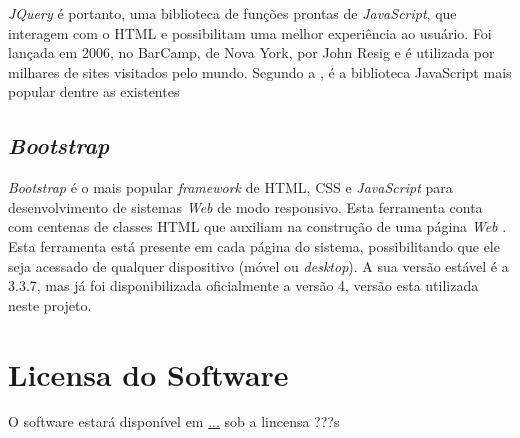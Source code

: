\textit{JQuery} é portanto, uma biblioteca de funções prontas de \textit{JavaScript}, que
interagem com o HTML e possibilitam uma melhor experiência ao usuário. Foi lançada
em 2006, no BarCamp, de Nova York, por John Resig e é utilizada por milhares de
sites visitados pelo mundo. Segundo a , é a biblioteca JavaScript
mais popular dentre as existentes



\subsection{\textit{Bootstrap}}

\textit{Bootstrap} é o mais popular \textit{framework} de HTML, CSS e \textit{JavaScript} para desenvolvimento de sistemas \textit{Web} de modo responsivo. Esta ferramenta conta com centenas de classes HTML que auxiliam na construção de uma página \textit{Web} \cite{bootstrap}.
Esta ferramenta está presente em cada página do sistema, possibilitando que ele seja acessado de qualquer dispositivo (móvel ou \textit{desktop}). A sua versão estável é a 3.3.7, mas já foi disponibilizada oficialmente a versão 4, versão esta utilizada neste projeto.



\section{Licensa do Software}

O software estará disponível em \url{...} sob a lincensa ???s